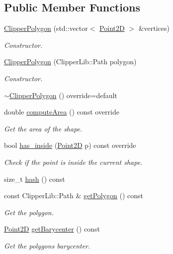 \subsection*{Public Member Functions}
\begin{DoxyCompactItemize}
\item 
\hyperlink{classGeometry_1_1ClipperPolygon_a8bb6fe04895b246e3acd28aa41158f09}{Clipper\+Polygon} (std\+::vector$<$ \hyperlink{classGeometry_1_1Point2D}{Point2D} $>$ \&vertices)
\begin{DoxyCompactList}\small\item\em Constructor. \end{DoxyCompactList}\item 
\hyperlink{classGeometry_1_1ClipperPolygon_a80bebeb5652e9ddd9e6582c1c023b1d6}{Clipper\+Polygon} (Clipper\+Lib\+::\+Path polygon)
\begin{DoxyCompactList}\small\item\em Constructor. \end{DoxyCompactList}\item 
\hyperlink{classGeometry_1_1ClipperPolygon_a5d266f89ec4621b9e3a4b0ea498da328}{$\sim$\+Clipper\+Polygon} () override=default
\item 
double \hyperlink{classGeometry_1_1ClipperPolygon_a452292446e85bf39afc64350180a289a}{compute\+Area} () const override
\begin{DoxyCompactList}\small\item\em Get the area of the shape. \end{DoxyCompactList}\item 
bool \hyperlink{classGeometry_1_1ClipperPolygon_a8e863b1d54c4ccc8c9d84bcccbbb137f}{has\+\_\+inside} (\hyperlink{classGeometry_1_1Point2D}{Point2D} p) const override
\begin{DoxyCompactList}\small\item\em Check if the point is inside the current shape. \end{DoxyCompactList}\item 
size\+\_\+t \hyperlink{classGeometry_1_1ClipperPolygon_a9d114ece2df3519162d0018c164187a4}{hash} () const 
\item 
const Clipper\+Lib\+::\+Path \& \hyperlink{classGeometry_1_1ClipperPolygon_ac1528fc32d76cb7a970e3649a53ec5ef}{get\+Polygon} () const 
\begin{DoxyCompactList}\small\item\em Get the polygon. \end{DoxyCompactList}\item 
\hyperlink{classGeometry_1_1Point2D}{Point2D} \hyperlink{classGeometry_1_1ClipperPolygon_a62c9a314154ba6af98a142378134578e}{get\+Barycenter} () const 
\begin{DoxyCompactList}\small\item\em Get the polygon\textquotesingle{}s barycenter. \end{DoxyCompactList}\end{DoxyCompactItemize}
